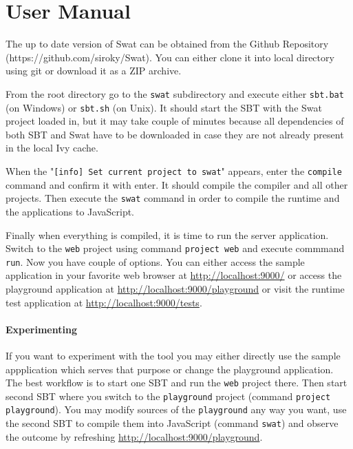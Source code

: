 \documentclass[12pt,a4paper]{report}
\begin{document}
\def\bibname{Bibliography}





\appendix
\appendixpage
\addappheadtotoc

\chapter{User Manual}

The up to date version of Swat can be obtained from the Github Repository (https://github.com/siroky/Swat). You can either clone it into local directory using git or download it as a ZIP archive.

From the root directory go to the \texttt{swat} subdirectory and execute either \texttt{sbt.bat} (on Windows) or \texttt{sbt.sh} (on Unix). It should start the SBT with the Swat project loaded in, but it may take couple of minutes because all dependencies of both SBT and Swat have to be downloaded in case they are not already present in the local Ivy cache.

When the "\texttt{[info] Set current project to swat}" appears, enter the \texttt{compile} command and confirm it with enter. It should compile the compiler and all other projects. Then execute the \texttt{swat} command in order to compile the runtime and the applications to JavaScript.

Finally when everything is compiled, it is time to run the server application. Switch to the \texttt{web} project using command \texttt{project web} and execute commmand \texttt{run}. Now you have couple of options. You can either access the sample application in your favorite web browser at \url{http://localhost:9000/} or access the playground application at \url{http://localhost:9000/playground} or visit the runtime test application at \url{http://localhost:9000/tests}.

\subsubsection*{Experimenting}

If you want to experiment with the tool you may either directly use the sample appplication which serves that purpose or change the playground application. The best workflow is to start one SBT and run the \texttt{web} project there. Then start second SBT where you switch to the \texttt{playground} project (command \texttt{project playground}). You may modify sources of the \texttt{playground} any way you want, use the second SBT to compile them into JavaScript (command \texttt{swat}) and observe the outcome by refreshing \url{http://localhost:9000/playground}.
\end{document}
